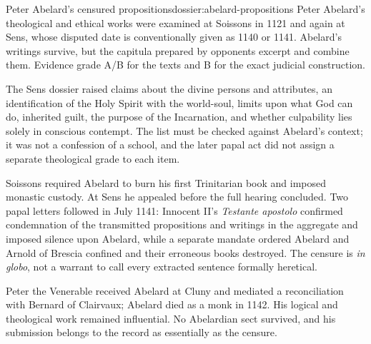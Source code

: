 \begin{heresydossier}{Peter Abelard's censured propositions}{dossier:abelard-propositions}
\objectfield Peter Abelard's theological and ethical works were examined at Soissons in 1121 and again at Sens, whose disputed date is conventionally given as 1140 or 1141. Abelard's writings survive, but the capitula prepared by opponents excerpt and combine them. Evidence grade A/B for the texts and B for the exact judicial construction.

\propositionfield The Sens dossier raised claims about the divine persons and attributes, an identification of the Holy Spirit with the world-soul, limits upon what God can do, inherited guilt, the purpose of the Incarnation, and whether culpability lies solely in conscious contempt. The list must be checked against Abelard's context; it was not a confession of a school, and the later papal act did not assign a separate theological grade to each item.

\responsefield Soissons required Abelard to burn his first Trinitarian book and imposed monastic custody. At Sens he appealed before the full hearing concluded. Two papal letters followed in July 1141: Innocent II's \emph{Testante apostolo} confirmed condemnation of the transmitted propositions and writings in the aggregate and imposed silence upon Abelard, while a separate mandate ordered Abelard and Arnold of Brescia confined and their erroneous books destroyed. The censure is \emph{in globo}, not a warrant to call every extracted sentence formally heretical.

\aftermathfield Peter the Venerable received Abelard at Cluny and mediated a reconciliation with Bernard of Clairvaux; Abelard died as a monk in 1142. His logical and theological work remained influential. No Abelardian sect survived, and his submission belongs to the record as essentially as the censure.
\end{heresydossier}

